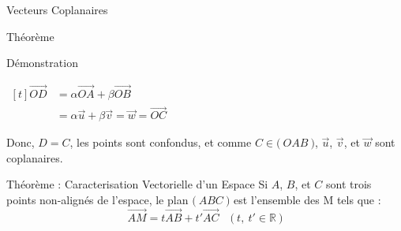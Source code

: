 \documentclass{cours}
\begin{document}
\begin{Gpartie}{Vecteurs Coplanaires}
\begin{Spartie}{Théorème}
\begin{SSpartie}{Démonstration}
\begin{itemize}[leftmargin=7ex]
                    $\begin{aligned}[t]
                        \overrightarrow{OD}&=\alpha\overrightarrow{OA}+\beta\overrightarrow{OB} \\
                        &=\alpha\vec{u}+\beta\vec{v}=\vec{w}=\overrightarrow{OC}
                    \end{aligned}$

                    Donc, $D=C$, les points sont confondus, et comme $C\in\big(~OAB~\big)$, $\vec{u}$, $\vec{v}$, et $\vec{w}$ sont coplanaires.
                \end{itemize}
            \end{SSpartie}
            \begin{SSpartie}{Théorème : Caracterisation Vectorielle d'un Espace} 
                Si $A$, $B$, et $C$ sont trois points non-alignés de l'espace, le plan $\big(~ABC~\big)$ est l'ensemble des M tels que : \[\overrightarrow{AM}=t\overrightarrow{AB}+t'\overrightarrow{AC}\quad\big(~t,~t'\in\mathbb{R}~\big)\]
            \end{SSpartie}
        \end{Spartie}
    \end{Gpartie}
    \vspace{-0.7cm} %
\end{document}
